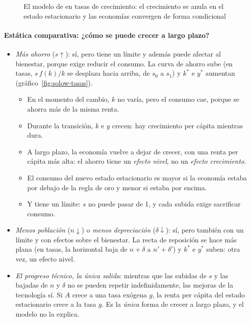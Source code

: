 \documentclass[11pt]{article}
\begin{document}
\begin{figure}[H]
\centering
\caption{El modelo de  en tasas de crecimiento: el crecimiento se anula en el estado estacionario y las economías convergen de forma condicional}\label{fig:solow-tasas-paso1}
\end{figure}

\paragraph{Estática comparativa: ¿cómo se puede crecer a largo plazo?}

\begin{itemize}
\item \emph{Más ahorro} ($s\uparrow$): sí, pero tiene un límite y además puede afectar al bienestar, porque exige reducir el consumo. La curva de ahorro sube (en tasas, $s\,f(k)/k$ se desplaza hacia arriba, de $s_0$ a $s_1$) y $k^*$ e $y^*$ aumentan (gráfico~\ref{fig:solow-tasas}).
  \begin{itemize}
  \item En el momento del cambio, $k$ no varía, pero el consumo cae, porque se ahorra más de la misma renta.
  \item Durante la transición, $k$ e $y$ crecen: hay crecimiento per cápita mientras dura.
  \item A largo plazo, la economía vuelve a dejar de crecer, con una renta per cápita más alta: el ahorro tiene un \emph{efecto nivel}, no un \emph{efecto crecimiento}.
  \item El consumo del nuevo estado estacionario es mayor si la economía estaba por debajo de la regla de oro y menor si estaba por encima.
  \item Y tiene un límite: $s$ no puede pasar de 1, y cada subida exige sacrificar consumo.
  \end{itemize}
\item \emph{Menos población} ($n\downarrow$) o \emph{menos depreciación} ($\delta\downarrow$): sí, pero también con un límite y con efectos sobre el bienestar. La recta de reposición se hace más plana (en tasas, la horizontal baja de $n+\delta$ a $n'+\delta'$) y $k^*$ e $y^*$ suben: otra vez, un efecto nivel.
\item \emph{El progreso técnico, la única salida}: mientras que las subidas de $s$ y las bajadas de $n$ y $\delta$ no se pueden repetir indefinidamente, las mejoras de la tecnología sí. Si $A$ crece a una tasa exógena $g$, la renta per cápita del estado estacionario crece a la tasa $g$. Es la \emph{única} forma de crecer a largo plazo, y el modelo no la explica.
\end{itemize}
\end{document}
